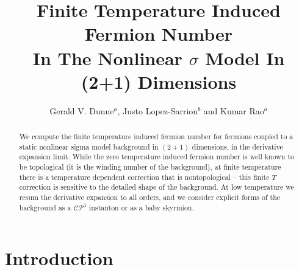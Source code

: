 \documentclass[a4paper,prd]{revtex4}
\begin{document}
\title{Finite Temperature Induced Fermion Number\\ In 
The Nonlinear $\sigma $ Model In (2+1) Dimensions }


\author{Gerald V. Dunne$^a$, Justo Lopez-Sarrion$^b$ and Kumar Rao$^a$}




\begin{abstract}
We compute the finite temperature induced fermion number for fermions coupled to
a static nonlinear sigma model background in $(2+1)$ dimensions, in the derivative
expansion limit. While the zero temperature induced fermion number is well
known to be topological (it is the winding number of the background), at finite
temperature there is a temperature dependent correction that is nontopological --
this finite $T$ correction is sensitive to the detailed shape of the
background. At low temperature we resum the derivative expansion to all orders, and
we consider explicit forms of the background as a $\mathcal{CP}^1$ instanton or as
a baby skyrmion.

\end{abstract}

\maketitle


\section{Introduction}
\end{document}
